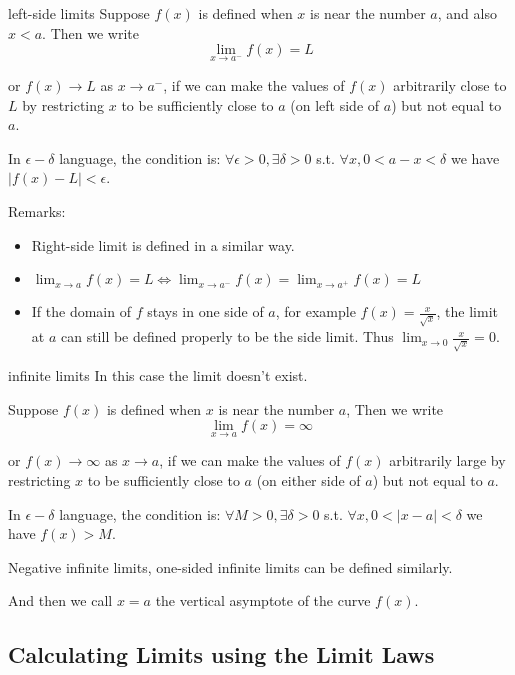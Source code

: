 \documentclass[Calculus 1 Recitation.tex]{subfiles}
\begin{document}
\begin{myleftlinebox}
	left-side limits
	\tcblower
	Suppose $f(x)$ is defined when $x$ is near the number $a$, and also $x<a$. Then we write
	\[\lim_{x\to a^-}f(x)=L\]

	or \(f(x)\to L\) as $x\to a^-$, if we can make the values of $f(x)$ arbitrarily close to $L$ by restricting $x$ to be sufficiently close to $a$ (on left side of $a$) but not equal to $a$. 

	In $\epsilon-\delta$ language, the condition is: $\forall \epsilon > 0, \exists \delta > 0$ s.t. $\forall x, 0 < a-x < \delta$ we have $|f(x) - L| < \epsilon$.

	Remarks:
	\begin{itemize}
		\item Right-side limit is defined in a similar way. 
		\item $\lim_{x\to a}f(x)=L \iff \lim_{x\to a^-}f(x)=\lim_{x\to a^+}f(x)=L$
		\item If the domain of $f$ stays in one side of $a$, for example $f(x)=\frac{x}{\sqrt{x}}$, the limit at $a$ can still be defined properly to be the side limit. Thus $\lim_{x\to 0}\frac{x}{\sqrt{x}}=0$.
	\end{itemize}
\end{myleftlinebox}

\begin{myleftlinebox}
	infinite limits
	\tcblower
	In this case the limit doesn't exist.

	Suppose $f(x)$ is defined when $x$ is near the number $a$, Then we write
	\[\lim_{x\to a}f(x)=\infty\]

	or \(f(x)\to \infty\) as $x\to a$, if we can make the values of $f(x)$ arbitrarily large by restricting $x$ to be sufficiently close to $a$ (on either side of $a$) but not equal to $a$. 

	In $\epsilon-\delta$ language, the condition is: $\forall M > 0, \exists \delta > 0$ s.t. $\forall x, 0 < |x - a| < \delta$ we have $f(x)>M$.

	Negative infinite limits, one-sided infinite limits can be defined similarly.
	
	And then we call $x=a$ the vertical asymptote of the curve $f(x)$.
\end{myleftlinebox}


\subsection{Calculating Limits using the Limit Laws}
\end{document}
